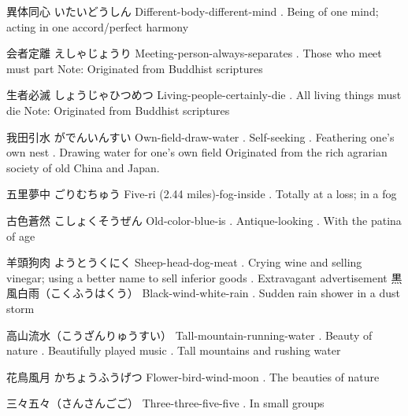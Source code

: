 \par{異体同心 \hfill\break
いたいどうしん \hfill\break
Different-body-different-mind \hfill{}. Being of one mind; acting in one accord\slash perfect harmony }

\par{会者定離 \hfill\break
えしゃじょうり \hfill\break
Meeting-person-always-separates \hfill{}. Those who meet must part \hfill\break
Note: Originated from Buddhist scriptures }

\par{生者必滅 \hfill\break
しょうじゃひつめつ \hfill\break
Living-people-certainly-die \hfill{}. All living things must die \hfill\break
Note: Originated from Buddhist scriptures }

\par{我田引水 \hfill\break
がでんいんすい \hfill\break
Own-field-draw-water \hfill{}. Self-seeking \hfill{}. Feathering one's own nest \hfill{}. Drawing water for one's own field \hfill\break
Originated from the rich agrarian society of old China and Japan. }

\par{五里夢中 \hfill\break
ごりむちゅう \hfill\break
Five-ri (2.44 miles)-fog-inside \hfill{}. Totally at a loss; in a fog }

\par{古色蒼然 \hfill\break
こしょくそうぜん \hfill\break
Old-color-blue-is \hfill{}. Antique-looking \hfill{}. With the patina of age }

\par{羊頭狗肉 \hfill\break
ようとうくにく \hfill\break
Sheep-head-dog-meat \hfill{}. Crying wine and selling vinegar; using a better name to sell inferior goods \hfill{}. Extravagant advertisement }
 黒風白雨（こくふうはくう） \hfill\break
Black-wind-white-rain \hfill{}. Sudden rain shower in a dust storm 
\par{高山流水（こうざんりゅうすい） \hfill\break
Tall-mountain-running-water \hfill{}. Beauty of nature \hfill{}. Beautifully played music \hfill{}. Tall mountains and rushing water }

\par{花鳥風月 \hfill\break
かちょうふうげつ \hfill\break
Flower-bird-wind-moon \hfill{}. The beauties of nature }

\par{三々五々（さんさんごご） \hfill\break
Three-three-five-five \hfill{}. In small groups }


